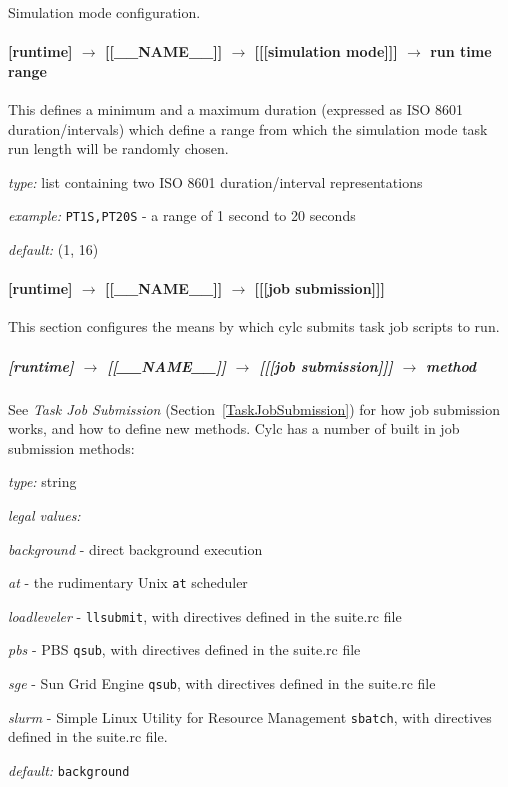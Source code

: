 Simulation mode configuration.

\paragraph[run time range]{[runtime] $\rightarrow$ [[\_\_NAME\_\_]] $\rightarrow$ [[[simulation mode]]] $\rightarrow$ run time range}

This defines a minimum and a maximum duration (expressed as ISO 8601
duration/intervals) which define a range from which the simulation mode task
run length will be randomly chosen.

\begin{myitemize}
    \item {\em type:} list containing two ISO 8601 duration/interval
    representations
    \item {\em example:} \lstinline=PT1S,PT20S= - a range of 1 second to 20
    seconds
    \item {\em default:} (1, 16)
\end{myitemize}

\paragraph[{[[[}job submission{]]]}]{[runtime] $\rightarrow$ [[\_\_NAME\_\_]] $\rightarrow$ [[[job submission]]]}

This section configures the means by which cylc submits task job scripts to run.

\subparagraph[method]{[runtime] $\rightarrow$ [[\_\_NAME\_\_]] $\rightarrow$ [[[job submission]]] $\rightarrow$ method}
\label{RuntimeJobSubMethods}

See {\em Task Job Submission} (Section~\ref{TaskJobSubmission})
for how job submission works, and how to define new methods.
Cylc has a number of built in job submission methods:
\begin{myitemize}
\item {\em type:} string
\item {\em legal values:}
   \begin{myitemize}
       \item {\em background} - direct background execution
       \item {\em at} - the rudimentary Unix \lstinline=at= scheduler
       \item {\em loadleveler} - \lstinline=llsubmit=, with directives defined in the suite.rc file
       \item {\em pbs} - PBS \lstinline=qsub=, with directives defined in the suite.rc file
       \item {\em sge} - Sun Grid Engine \lstinline=qsub=, with directives defined in the suite.rc file
       \item {\em slurm} - Simple Linux Utility for Resource Management \lstinline=sbatch=, with directives defined in the suite.rc file.
   \end{myitemize}
\item {\em default:} \lstinline=background=
\end{myitemize}

